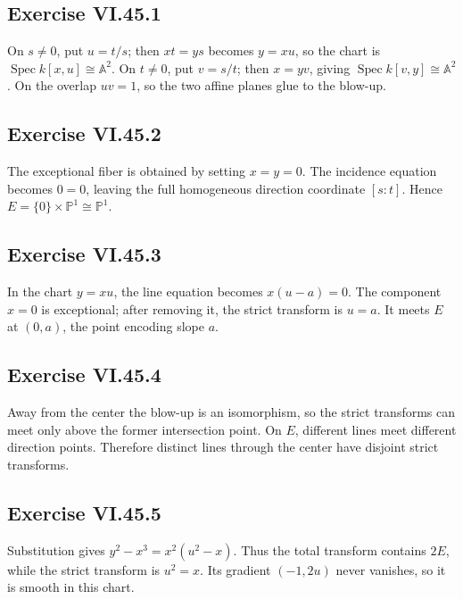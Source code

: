 \subsection*{Exercise VI.45.1}
\begin{solution}
On \(s\neq0\), put \(u=t/s\); then \(xt=ys\) becomes \(y=xu\), so the chart is \(\operatorname{Spec}k[x,u]\cong\mathbb A^2\).  On \(t\neq0\), put \(v=s/t\); then \(x=yv\), giving \(\operatorname{Spec}k[v,y]\cong\mathbb A^2\).  On the overlap \(uv=1\), so the two affine planes glue to the blow-up.
\end{solution}

\subsection*{Exercise VI.45.2}
\begin{solution}
The exceptional fiber is obtained by setting \(x=y=0\).  The incidence equation becomes \(0=0\), leaving the full homogeneous direction coordinate \([s:t]\).  Hence \(E=\{0\}\times\mathbb P^1\cong\mathbb P^1\).
\end{solution}

\subsection*{Exercise VI.45.3}
\begin{solution}
In the chart \(y=xu\), the line equation becomes \(x(u-a)=0\).  The component \(x=0\) is exceptional; after removing it, the strict transform is \(u=a\).  It meets \(E\) at \((0,a)\), the point encoding slope \(a\).
\end{solution}

\subsection*{Exercise VI.45.4}
\begin{solution}
Away from the center the blow-up is an isomorphism, so the strict transforms can meet only above the former intersection point.  On \(E\), different lines meet different direction points.  Therefore distinct lines through the center have disjoint strict transforms.
\end{solution}

\subsection*{Exercise VI.45.5}
\begin{solution}
Substitution gives \(y^2-x^3=x^2(u^2-x)\).  Thus the total transform contains \(2E\), while the strict transform is \(u^2=x\).  Its gradient \((-1,2u)\) never vanishes, so it is smooth in this chart.
\end{solution}

